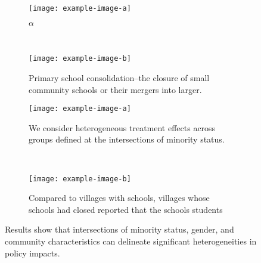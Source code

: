 \documentclass[12pt,english]{article}
\begin{document}
\par\medskip
\newcommand{\subFigWidth}{0.27}
\newcommand{\subFigGraphWidth}{0.90}
\newcommand{\maincapwidth}{0.80}
\begin{figure}[H]
    \centering
	\label{fig:verthorz}
    \begin{subfigure}[t]{\subFigWidth\textwidth}
        \centering
        \texttt{[image: example-image-a]}
        \captionsetup{width=\subFigGraphWidth\textwidth}
        \caption{$\alpha$}
    \end{subfigure}~
	\begin{subfigure}[t]{\subFigWidth\textwidth}
	    \centering
    	\texttt{[image: example-image-b]}
    	\captionsetup{width=\subFigGraphWidth\textwidth}
    	\caption{Primary school consolidation--the closure of small community schools or their mergers into larger.}
	\end{subfigure}
	\par\medskip
	\begin{subfigure}[t]{\subFigWidth\textwidth}
        \centering
        \texttt{[image: example-image-a]}
        \captionsetup{width=\subFigGraphWidth\textwidth}
        \caption{We consider heterogeneous treatment effects across groups defined at the intersections of minority status.}
    \end{subfigure}~
	\begin{subfigure}[t]{\subFigWidth\textwidth}
	    \centering
	    \captionsetup{width=\subFigGraphWidth\textwidth}
    	\texttt{[image: example-image-b]}
    	\caption{Compared to villages with schools, villages whose schools had closed reported that the schools students}
	\end{subfigure}
	\captionsetup{width=\maincapwidth\textwidth}
	\caption{Results show that intersections of minority status, gender, and community characteristics can delineate significant heterogeneities in policy impacts.}
\end{figure}
\pagebreak
\end{document}
